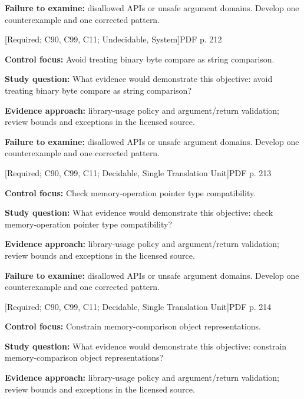 \documentclass[10pt,letterpaper]{article}
\begin{document}
\textbf{Failure to examine:} disallowed APIs or unsafe argument domains. Develop one counterexample and one corrected pattern.\par
\smallskip
{}
 \textsf{\footnotesize [Required; C90, C99, C11; Undecidable, System]}\hfill{\footnotesize PDF p. 212}\par
\textbf{Control focus:} Avoid treating binary byte compare as string comparison.\par
\textbf{Study question:} What evidence would demonstrate this objective: avoid treating binary byte compare as string comparison?\par
\textbf{Evidence approach:} library-usage policy and argument/return validation; review bounds and exceptions in the licensed source.\par
\textbf{Failure to examine:} disallowed APIs or unsafe argument domains. Develop one counterexample and one corrected pattern.\par
\smallskip
{}
 \textsf{\footnotesize [Required; C90, C99, C11; Decidable, Single Translation Unit]}\hfill{\footnotesize PDF p. 213}\par
\textbf{Control focus:} Check memory-operation pointer type compatibility.\par
\textbf{Study question:} What evidence would demonstrate this objective: check memory-operation pointer type compatibility?\par
\textbf{Evidence approach:} library-usage policy and argument/return validation; review bounds and exceptions in the licensed source.\par
\textbf{Failure to examine:} disallowed APIs or unsafe argument domains. Develop one counterexample and one corrected pattern.\par
\smallskip
{}
 \textsf{\footnotesize [Required; C90, C99, C11; Decidable, Single Translation Unit]}\hfill{\footnotesize PDF p. 214}\par
\textbf{Control focus:} Constrain memory-comparison object representations.\par
\textbf{Study question:} What evidence would demonstrate this objective: constrain memory-comparison object representations?\par
\textbf{Evidence approach:} library-usage policy and argument/return validation; review bounds and exceptions in the licensed source.\par
\end{document}
